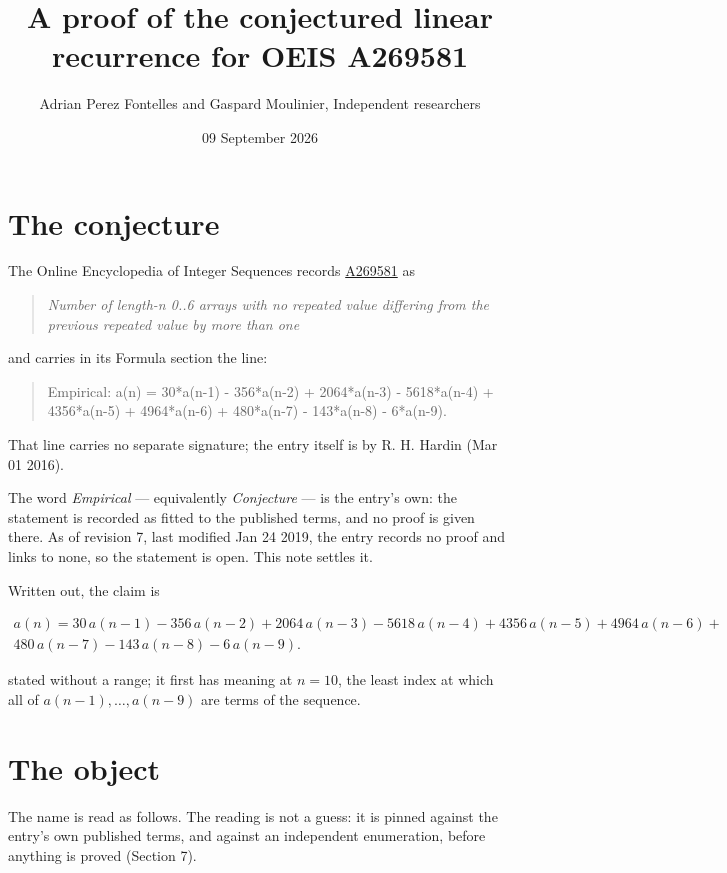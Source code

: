 \documentclass[11pt]{article}
\title{A proof of the conjectured linear recurrence for OEIS A269581}
\author{Adrian Perez Fontelles and Gaspard Moulinier, Independent researchers}
\date{09 September 2026}
\theoremstyle{definition}
\begin{document}
\maketitle
\section{The conjecture}

The Online Encyclopedia of Integer Sequences records \href{https://oeis.org/A269581}{A269581} as

\begin{quote}\itshape Number of length-n 0..6 arrays with no repeated value differing from the previous repeated value by more than one\end{quote}

and carries in its Formula section the line:

\begin{quote}\ttfamily Empirical: a(n) = 30*a(n-1) - 356*a(n-2) + 2064*a(n-3) - 5618*a(n-4) + 4356*a(n-5) + 4964*a(n-6) + 480*a(n-7) - 143*a(n-8) - 6*a(n-9).\end{quote}

That line carries no separate signature; the entry itself is by R. H. Hardin (Mar 01 2016).

The word {\itshape Empirical} --- equivalently {\itshape Conjecture} --- is the entry's own: the statement is recorded as fitted to the published terms, and no proof is given there. As of revision 7, last modified Jan 24 2019, the entry records no proof and links to none, so the statement is open. This note settles it.

Written out, the claim is

\begin{multline*} a(n) = 30\,a(n-1) - 356\,a(n-2) + 2064\,a(n-3) - 5618\,a(n-4) + 4356\,a(n-5) + 4964\,a(n-6) + \\ 480\,a(n-7) - 143\,a(n-8) - 6\,a(n-9). \end{multline*}

stated without a range; it first has meaning at $n = 10$, the least index at which all of $a(n-1),\dots,a(n-9)$ are terms of the sequence.

\section{The object}

The name is read as follows. The reading is not a guess: it is pinned against the entry's own published terms, and against an independent enumeration, before anything is proved (Section 7).
\end{document}
